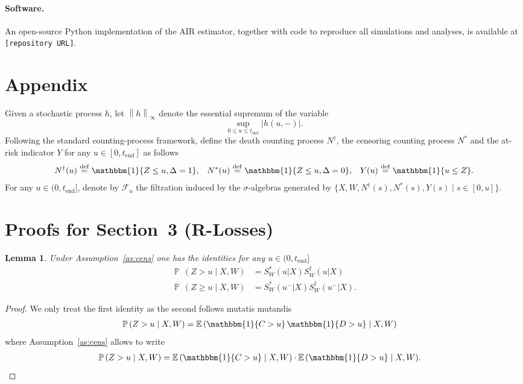 \documentclass{article}
\newtheorem{lemma}[theorem]{Lemma}
\DeclareMathOperator*{\eqdef }{\,\stackrel{\text{def}}{=}\,}
\DeclareMathOperator{\IDF}{\mathbbm{1}}%
\DeclareMathOperator{\EX}{\mathbb{E}\,}
\DeclareMathOperator{\PR}{\mathbb{P}\,}
\newcommand{\norm}[1]{\left\lVert#1\right\rVert}
\newcommand{\tend}{t_{\mathrm{end}}}
\begin{document}
\paragraph{Software.}
An open-source Python implementation of the AIR estimator, together with code to reproduce all simulations and analyses, is available at \texttt{[repository URL]}.


\appendix
\section*{Appendix}
Given a stochastic process $h$, let $\norm{h}_\infty$ denote the essential supremum of the variable
\[ \sup_{0 \leq u \leq \tend} |h(u,-)|.\]
Following the standard counting-process framework, define the death counting process $N^\dagger$, the censoring counting process $N^*$ and 
the at-risk indicator $Y$ for any $u \in [0,\tend]$ as follows
\begin{align*}
N^\dagger(u) \eqdef \IDF\{ Z \leq u, \Delta = 1\}, && N^*(u) \eqdef \IDF\{ Z \leq u, \Delta = 0\}, && Y(u) \eqdef \IDF\{ u \leq Z \}.
\end{align*}
For any $u \in (0,\tend]$, denote by $\mathcal{F}_u$ the filtration induced by the $\sigma$-algebras 
generated by $\{X,W,N^\dagger(s),N^*(s),Y(s) \mid s \in [0,u] \}$.

\section{Proofs for Section~3 (R-Losses)}\label{appendix:proof_rlosses}

\begin{lemma}\label{lem:proba_identity}
Under Assumption~\ref{as:cens} one has the identities for any $u \in (0,\tend]$
\begin{align*}
\PR(Z > u \mid X,W) &= S_W^*(u|X)S_W^\dagger(u|X) \\
\PR(Z \geq u \mid X,W) &= S_W^*(u^-|X)S_W^\dagger(u^-|X).
\end{align*}
\end{lemma}
\begin{proof}
We only treat the first identity as the second follows mutatis mutandis
\begin{align*}
\PR(Z > u \mid X,W) &= \EX( \IDF\{C > u\} \IDF\{D > u\} \mid X,W )
\end{align*}
where Assumption~\ref{as:cens} allows to write
\begin{align*}
\PR(Z > u \mid X,W) &= \EX( \IDF\{C > u\} \mid X,W) \cdot \EX(\IDF\{D > u\} \mid X,W ).
\end{align*}
\end{proof}
\end{document}
